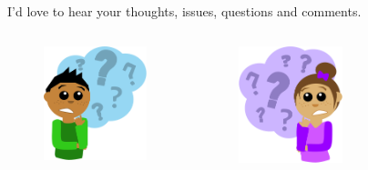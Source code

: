 \documentclass[xetex, aspectratio=169,professionalfont]{beamer}
\begin{document}
\begin{frame}
\centering 
\alert{I'd love to hear your thoughts, issues, questions and comments.}
\begin{columns}
	\begin{figure}
		\includegraphics[width=3cm]{img/questionguy}
	\end{figure}
		\begin{figure}
		\includegraphics[width=3cm]{img/questiongirl}
	\end{figure}
\end{columns}
\end{frame}
\end{document}
